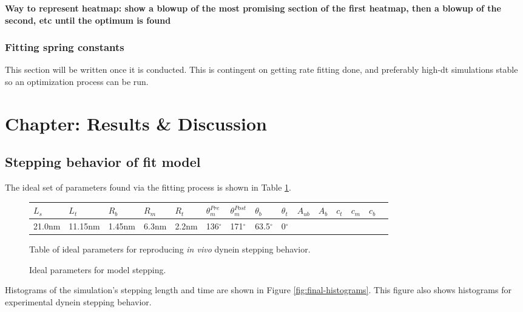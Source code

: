 \documentclass[10pt]{article} %
\begin{document}
\textbf{Way to represent heatmap: show a blowup of the most promising section of the first heatmap, then a blowup of the second, etc until the optimum is found}

\subsubsection{Fitting spring constants}
This section will be written once it is conducted. This is contingent on getting rate fitting done, and preferably high-dt simulations stable so an optimization process can be run.\\

\section{Chapter: Results \& Discussion}
\subsection{Stepping behavior of fit model}
The ideal set of parameters found via the fitting process is shown in Table \ref{table:final-parameter-table}.\\

\begin{figure}[H]
  \centering
  \begin{tabular}{| l | l | l | l | l | l | l | l | l | l | l | l | l | l | l |}
    \hline
    $L_s$ & $L_t$ & $R_b$ & $R_m$ & $R_t$ & $\theta_{m}^{Pre}$ & $\theta_{m}^{Post}$ & $\theta_{b}$ & $\theta_{t}$ & $A_{ub}$ & $A_b$ & $c_t$ & $c_m$  &$c_b$\\ \hline
    21.0nm & 11.15nm & 1.45nm & 6.3nm & 2.2nm & 136$^{\circ}$ & 171$^{\circ}$ & 63.5$^{\circ}$ & 0$^{\circ}$ &  &  &  &   & \\ \hline
  \end{tabular}
  \caption{Ideal parameters for model stepping.}{Table of ideal parameters for reproducing \textit{in vivo} dynein stepping behavior.}
  \label{table:final-parameter-table}
\end{figure}

Histograms of the simulation's stepping length and time are shown in Figure \ref{fig:final-histograms}. This figure also shows histograms for experimental dynein stepping behavior.\\
\end{document}
